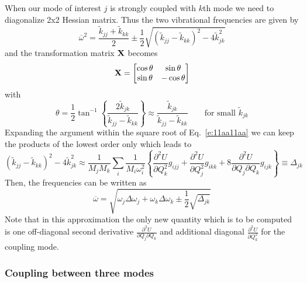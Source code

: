 \documentclass[a4paper,titlepage,twoside,fleqn,12pt]{book}
\newcommand{\sderiv}[2]{\ensuremath{
\frac{\partial^2 #1}{\partial #2^2}
}}
\newcommand{\sderivd}[3]{\ensuremath{
\frac{\partial^2 #1}{\partial #2 \partial #3}
}}
\begin{document}
\begin{refsection}
When our mode of interest $j$ is strongly coupled
with $k$th mode we need to diagonalize 2x2 Hessian matrix.
Thus the two vibrational frequencies are given by
%
\begin{equation} \label{e:11aa11aa}
 \overline{\omega}^2 = %
\frac{ \tilde{k}_{jj} + \tilde{k}_{kk} }{2}
\pm \frac{1}{2}
\sqrt{\left( \tilde{k}_{jj} - \tilde{k}_{kk}\right)^2 - 4\tilde{k}_{jk}^2}
\end{equation}
%
and the transformation matrix $\bf X$ becomes
%
\begin{equation}
 {\bf X} = 
\begin{bmatrix}
\cos{\theta} &   \sin{\theta}\\ 
\sin{\theta} &  -\cos{\theta}
\end{bmatrix}
\end{equation}
%
with
%
\begin{equation}
\theta = \frac{1}{2} \tan^{-1}\left\{\frac{2\tilde{k}_{jk}}{\tilde{k}_{jj} - \tilde{k}_{kk}}\right\}
 \approx \frac{\tilde{k}_{jk}}{\tilde{k}_{jj} - \tilde{k}_{kk}} \qquad\text{for small $\tilde{k}_{jk}$}
\end{equation}
%
Expanding the argument within the square root of Eq.~\eqref{e:11aa11aa}
we can keep the products of the lowest order only which leads to
%
\begin{equation}
\left( \tilde{k}_{jj} - \tilde{k}_{kk}\right)^2 - 4\tilde{k}_{jk}^2
\approx
\frac{1}{M_jM_k} \sum_i \frac{1}{M_i\omega_i^2}
\left\{ 
\sderiv{U}{Q_k} g_{ijj} + \sderiv{U}{Q_j} g_{ikk} + 8\sderivd{U}{Q_j}{Q_k} g_{ijk}
\right\} \equiv \Delta_{jk}
\end{equation}
%
Then, the frequencies can be written as
%
\begin{equation}
 \overline{\omega} = \sqrt{
\omega_j\Delta\omega_j + \omega_k\Delta\omega_k \pm \frac{1}{2} \sqrt{\Delta_{jk}}
}
\end{equation}
%
Note that in this approximation the only new quantity which is to
be computed is one off\hyp{}diagonal second derivative $\sderivd{U}{Q_j}{Q_k}$
and additional diagonal $\sderiv{U}{Q_k}$ for the coupling mode. 

\subsubsection{Coupling between three modes}


\end{refsection}
\end{document}
